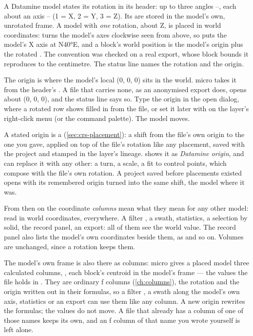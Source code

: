 A Datamine model states its rotation in its header: up to three angles –, each about an axis – (1 = X, 2 = Y, 3 = Z). Its    are stored in the model's own, unrotated frame. A model with \emph{one} rotation,  about Z, is placed in world coordinates:  turns the model's axes clockwise seen from above, so  puts the model's X axis at N40°E, and a block's world position is the model's origin plus the rotated   . The convention was checked on a real export, whose block bounds it reproduces to the centimetre. The status line names the rotation and the origin.

The origin is where the model's local (0, 0, 0) sits in the world. micro takes it from the header's   . A file that carries none, as an anonymised export does, opens about (0, 0, 0), and the status line says so. Type the origin in the open dialog, where a rotated  row shows  filled in from the file, or set it later with  on the layer's right-click menu (or the command palette). The model moves.

A stated origin is a  (\cref{sec:crs-placement}): a shift from the file's own origin to the one you gave, applied on top of the file's rotation like any placement, saved with the project and stamped in the layer's lineage.  shows it as \emph{Datamine origin}, and can replace it with any other: a turn, a scale, a fit to control points, which compose with the file's own rotation. A project saved before placements existed opens with its remembered origin turned into the same shift, the model where it was.

From then on the coordinate \emph{columns} mean what they mean for any other model:    read in world coordinates, everywhere. A filter , a swath, statistics, a selection by solid, the record panel, an export: all of them see the world value. The record panel also lists the model's own coordinates beside them, as  and so on. Volumes are unchanged, since a rotation keeps them.

The model's own frame is also there as columns: micro gives a placed model three calculated columns,   , each block's centroid in the model's frame — the values the file holds in   . They are ordinary ƒ columns (\cref{ch:columns}), the rotation and the origin written out in their formulas, so a filter , a swath along the model's own axis, statistics or an export can use them like any column. A new origin rewrites the formulas; the values do not move. A file that already has a column of one of those names keeps its own, and an ƒ column of that name you wrote yourself is left alone.

